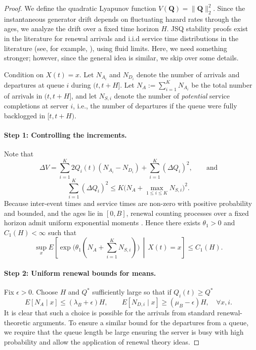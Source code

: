 \documentclass[11pt]{article}
\newcommand{\E}{E}
\begin{document}
\begin{proof}
We define the quadratic Lyapunov function $V(\mathbf Q)=\|\mathbf Q\|_2^2$.
Since the instantaneous generator drift depends on fluctuating hazard rates through the ages,
we analyze the drift over a fixed time horizon $H$. JSQ stability proofs exist in the literature for renewal arrivals and i.i.d service time distributions in the literature (see, for example, \cite{foss1998stability}), using fluid limits. Here, we need something stronger; however, since the general idea is similar, we skip over some details.

Condition on $X(t)=x$. Let $N_{A_i}$ and $N_{D_i}$ denote the number of arrivals and departures
at queue $i$ during $(t,t+H]$.
Let $N_A:=\sum_{i=1}^K N_{A_i}$ be the total number of arrivals in $(t,t+H]$, and let
$N_{S,i}$ denote the number of \emph{potential} service completions at server $i$, i.e., the number of departures if the queue were fully backlogged in $[t,t+H).$

\paragraph{Step 1: Controlling the increments.}
Note that
\begin{equation}
\label{eq:deltaV}
\Delta V
= \sum_{i=1}^K 2Q_i(t)(N_{A_i}-N_{D_i}) + \sum_{i=1}^K (\Delta Q_i)^2, \qquad\mathrm{and}
\end{equation}
\[
\sum_{i=1}^K (\Delta Q_i)^2
\le
K\Big(N_A+\max_{1\le i\le K}N_{S,i}\Big)^2 .
\]
Because inter-event times and service times are non-zero with positive probability and bounded, and the ages lie in $[0,B]$,
renewal counting processes over a fixed horizon admit uniform exponential moments \cite{asmussen2007applied}.
Hence there exists $\theta_1>0$ and $C_1(H)<\infty$ such that
\begin{equation}
\label{eq:mgf-counts}
\sup_x
\E\!\left[
\exp\!\big(\theta_1(N_A+\sum_{i=1}^K N_{S,i})\big)
\,\middle|\,
X(t)=x
\right]
\le C_1(H).
\end{equation}

\paragraph{Step 2: Uniform renewal bounds for means.}
Fix $\epsilon>0.$
Choose $H$ and $Q^*$ sufficiently large so that if $Q_i(t)\geq Q^*$
\begin{equation}
\label{eq:mean-renewal}
\E[N_A\mid x]\le (\lambda_B+\epsilon)H,
\qquad
\E[N_{D,i}\mid x]\ge (\mu_B-\epsilon)H,
\quad \forall x,i .
\end{equation}
It is clear that such a choice is possible for the arrivals from standard renewal-theoretic arguments. To ensure a similar bound for the departures from a queue, we require that the queue length be large ensuring the server is busy with high probability and allow the application of renewal theory ideas. 


\end{proof}
\end{document}
